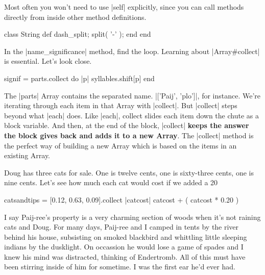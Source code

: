 \documentclass[12pt,twoside]{report}
\begin{document}
Most often you won't need to use \rubyinline|self|
explicitly, since you can call methods directly from inside other
method definitions.


\begin{rubycode}

 class String
   def dash_split; split( '-' ); end
 end

\end{rubycode}


In the \rubyinline|name_significance| method, find the
loop.  Learning about \rubyinline|Array#collect| is
essential. Let's look close.


\begin{rubycode}

 signif = parts.collect do |p|
   syllables.shift[p]
 end

\end{rubycode}


The \rubyinline|parts| Array contains the separated
name.  \rubyinline|['Paij', 'plo']|, for instance.
We're iterating through each item in that Array with
\rubyinline|collect|.  But
\rubyinline|collect| steps beyond what
\rubyinline|each| does.  Like
\rubyinline|each|, collect slides each item down the
chute as a block variable.  And then, at the end of the block,
\rubyinline|collect| {\bf keeps the answer the block
  gives back and adds it to a new Array}.  The
\rubyinline|collect| method is the perfect way of
building a new Array which is based on the items in an existing Array.

Doug has three cats for sale.  One is twelve cents, one is sixty-three
cents, one is nine cents. Let's see how much each cat would cost if we
added a 20%


\begin{rubycode}

 catsandtips = [0.12, 0.63, 0.09].collect { |catcost| catcost + ( catcost * 0.20 ) }

\end{rubycode}


I say Paij-ree's property is a very charming section of woods when
it's not raining cats and Doug. For many days, Paij-ree and I camped
in tents by the river behind his house, subsisting on smoked blackbird
and whittling little sleeping indians by the dusklight.  On occassion
he would lose a game of spades and I knew his mind was distracted,
thinking of Endertromb.  All of this must have been stirring inside of
him for sometime.  I was the first ear he'd ever had.
\end{document}
